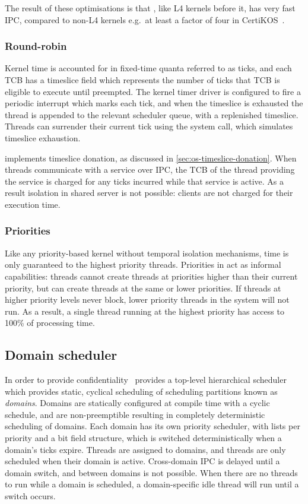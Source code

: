 The result of these optimisations is that \selfour, like L4 kernels before it, has very fast
\gls{IPC}, compared to non-L4 kernels e.g.\ at least a factor of four in CertiKOS~\citep{Gu_SCWKSC_16}.

\subsubsection{Round-robin}
\label{sec:seL4-round-robin}

Kernel time is accounted for in fixed-time quanta referred to as ticks, and each TCB has a timeslice
field which represents the number of ticks that TCB is eligible to execute until preempted.
The kernel timer driver is configured to fire a periodic interrupt which marks each tick,
and when the timeslice is exhausted the thread is appended to the relevant scheduler queue,
with a replenished timeslice.
Threads can surrender their current tick using the \yield system call, which simulates
timeslice exhaustion. 

\selfour implements timeslice donation, as discussed in \cref{sec:os-timeslice-donation}. 
When threads communicate with a service over \gls{IPC}, the TCB of the thread providing the service
is charged for any ticks incurred while that service is active. As a result isolation in shared
server is not possible: clients are not charged for their execution time.

\subsubsection{Priorities}

Like any priority-based kernel without temporal isolation mechanisms, time is only guaranteed to the highest priority threads.
Priorities in \selfour act as informal capabilities: threads cannot create threads at priorities higher than their current priority, but can create threads at the same or lower priorities.
If threads at higher priority levels never block, lower priority threads in the system will not run.
As a result, a single thread running at the highest priority has access to 100\% of processing time.

\subsection{Domain scheduler}
\label{sec:sel4-domain-scheduler}

In order to provide confidentiality~\citep{Murray_MBGBSLGK_13} \selfour provides a top-level hierarchical scheduler
which provides static, cyclical scheduling of scheduling partitions known as \emph{domains}. 
Domains are statically configured at compile time with a cyclic schedule, and are non-preemptible
resulting in completely deterministic scheduling of domains.
Each domain has its own priority scheduler, with lists per priority and a bit field structure, which is switched deterministically when a domain's
ticks expire. 
Threads are assigned to domains, and threads are only scheduled when their domain is active.
Cross-domain \gls{IPC} is delayed until a domain switch, and \yield between domains is not
possible. When there are no threads to run while a domain is scheduled, a domain-specific idle thread will run until a switch occurs.

